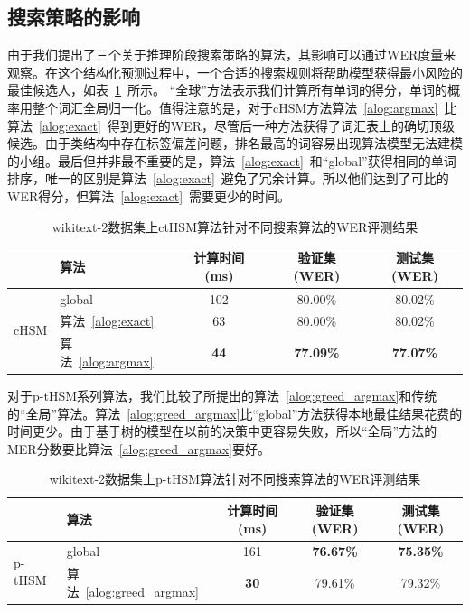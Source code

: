 \subsection{搜索策略的影响}
由于我们提出了三个关于推理阶段搜索策略的算法，其影响可以通过WER度量来观察。在这个结构化预测过程中，一个合适的搜索规则将帮助模型获得最小风险的最佳候选人，如表~\ref{tab:search}~所示。 “全球”方法表示我们计算所有单词的得分，单词的概率用整个词汇全局归一化。值得注意的是，对于cHSM方法算法~\ref{alog:argmax}~比算法~\ref{alog:exact}~得到更好的WER，尽管后一种方法获得了词汇表上的确切顶级候选。由于类结构中存在标签偏差问题，排名最高的词容易出现算法模型无法建模的小组。最后但并非最不重要的是，算法~\ref{alog:exact}~和``global''获得相同的单词排序，唯一的区别是算法~\ref{alog:exact}~避免了冗余计算。所以他们达到了可比的WER得分，但算法~\ref{alog:exact}~需要更少的时间。
\begin{table}[!ht]
  \centering
  \caption{wikitext-2数据集上ctHSM算法针对不同搜索算法的WER评测结果\label{tab:search}}
\begin{tabular}{llccc}
  \toprule
   & 算法&计算时间 (ms)&验证集 (WER)& 测试集(WER)\\ \midrule
  \multirow{3}{*}{cHSM} &global&102& 80.00\%& 80.02\%\\
        &算法~\ref{alog:exact}&63& 80.00\%& 80.02\%\\
        &算法~\ref{alog:argmax}&\textbf{44}&\textbf{ 77.09\%}&\textbf{ 77.07\%}\\
  \bottomrule
\end{tabular}
\end{table}


对于p-tHSM系列算法，我们比较了所提出的算法~\ref{alog:greed_argmax}和传统的“全局”算法。算法~\ref{alog:greed_argmax}比“global”方法获得本地最佳结果花费的时间更少。由于基于树的模型在以前的决策中更容易失败，所以“全局”方法的MER分数要比算法~\ref{alog:greed_argmax}要好。
\begin{table}[!ht]
  \centering
  \caption{wikitext-2数据集上p-tHSM算法针对不同搜索算法的WER评测结果\label{tab:psearch2}}
\begin{tabular}{llccc}
  \toprule
        & 算法&计算时间 (ms)&验证集 (WER)& 测试集(WER)\\ \midrule
  \multirow{2}{*}{p-tHSM}  &global&161& \textbf{76.67\%}&\textbf{75.35\%}\\
        &算法~\ref{alog:greed_argmax}&\textbf{30} & 79.61\%&79.32\%\\
  \bottomrule
\end{tabular}
\end{table}


